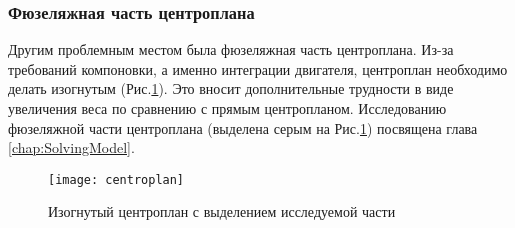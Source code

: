 \subsubsection{Фюзеляжная часть центроплана}

Другим проблемным местом была фюзеляжная часть центроплана. Из-за требований компоновки, а именно интеграции двигателя, центроплан необходимо делать изогнутым (Рис.\ref{fig:centroplan}). Это вносит дополнительные трудности в виде увеличения веса по сравнению с прямым центропланом. Исследованию фюзеляжной части центроплана (выделена серым на Рис.\ref{fig:centroplan}) посвящена глава \ref{chap:SolvingModel}.

\begin{figure}[ht]
\centering
\texttt{[image: centroplan]}
\caption{Изогнутый центроплан с выделением исследуемой части}
\label{fig:centroplan}
\end{figure}